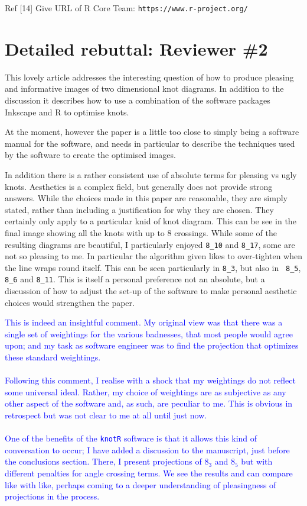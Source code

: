 \documentclass[12pt]{article}
\begin{document}
Ref [14]  Give URL of  R Core Team:  {\tt https://www.r-project.org/}


\section*{Detailed rebuttal: Reviewer \#2}

This lovely article addresses the interesting question of
how to produce pleasing and informative images of two dimensional knot
diagrams. In addition to the discussion it describes how to use a
combination of the software packages Inkscape and R to optimise knots.

At the moment, however the paper is a little too close to simply being
a software manual for the software, and needs in particular to
describe the techniques used by the software to create the optimised
images.

In addition there is a rather consistent use of absolute terms for
pleasing vs ugly knots. Aesthetics is a complex field, but generally
does not provide strong answers. While the choices made in this paper
are reasonable, they are simply stated, rather than including a
justification for why they are chosen. They certainly only apply to a
particular knid of knot diagram. This can be see in the final image
showing all the knots with up to 8 crossings. While some of the
resulting diagrams are beautiful, I particularly enjoyed {\tt 8\_10}
and {\tt 8\_17}, some are not so pleasing to me. In particular the
algorithm given likes to over-tighten when the line wraps round
itself. This can be seen particularly in {\tt 8\_3}, but also in {\tt
  8\_5}, {\tt 8\_6} and {\tt 8\_11}. This is itself a personal
preference not an absolute, but a discussion of how to adjust the
set-up of the software to make personal aesthetic choices would
strengthen the paper.

\textcolor{blue}{This is indeed an insightful comment.  My original
  view was that there was a single set of weightings for the various
  badnesses, that most people would agree upon; and my task as
  software engineer was to find the projection that optimizes these
  standard weightings.\\ \\ Following this comment, I realise with a
  shock that my weightings do not reflect some universal ideal.
  Rather, my choice of weightings are as subjective as any other
  aspect of the software and, as such, are peculiar to me.  This is
  obvious in retrospect but was not clear to me at all until just
  now.\\ \\ One of the benefits of the {\tt knotR} software is that it
  allows this kind of conversation to occur; I have added a discussion
  to the manuscript, just before the conclusions section.  There, I
  present projections of $8_3$ and $8_5$ but with different penalties
  for angle crossing terms.  We see the results and can compare like
  with like, perhaps coming to a deeper understanding of pleasingness
  of projections in the process.\\ \\}
\end{document}
